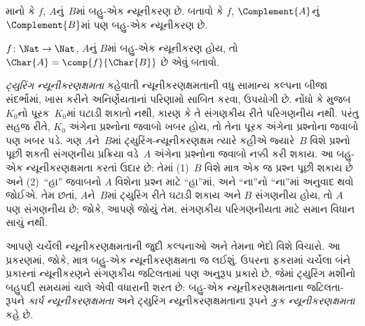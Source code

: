 \documentclass[../../../include/open-logic-section]{subfiles}
\begin{document}
\begin{prob}
માનો કે $f$, $A$નું~$B$માં બહુ-એક ન્યૂનીકરણ છે. બતાવો કે
$f$, $\Complement{A}$નું $\Complement{B}$માં પણ બહુ-એક
ન્યૂનીકરણ છે.
\end{prob}

\begin{prob}
$f\colon \Nat \to \Nat$, $A$નું $B$માં બહુ-એક ન્યૂનીકરણ હોય, તો
$\Char{A} = \comp{f}{\Char{B}}$ છે એવું બતાવો.
\end{prob}

\begin{digress}
\emph{ટ્યુરિંગ ન્યૂનીકરણક્ષમતા} કહેવાતી ન્યૂનીકરણક્ષમતાની
વધુ સામાન્ય કલ્પના બીજા સંદર્ભોમાં, ખાસ કરીને
અનિર્ણેયતાનાં પરિણામો સાબિત કરવા, ઉપયોગી છે. નોંધો કે
 મુજબ $K_0$નો પૂરક~$K_0$માં
ઘટાડી શકાતો નથી, કારણ કે તે સંગણકીય રીતે પરિગણનીય નથી.
પરંતુ સહજ રીતે, $K_0$ અંગેના પ્રશ્નોના જવાબો ખબર હોય, તો
તેના પૂરક અંગેના પ્રશ્નોના જવાબો પણ ખબર પડે. ગણ $A$ને~$B$માં
ટ્યુરિંગ-ન્યૂનીકરણક્ષમ ત્યારે કહીએ જ્યારે~$B$ વિશે પ્રશ્નો
પૂછી શકતી સંગણનીય પ્રક્રિયા વડે~$A$ અંગેના પ્રશ્નોના જવાબો
નક્કી કરી શકાય. આ બહુ-એક ન્યૂનીકરણક્ષમતા કરતાં ઉદાર છે:
તેમાં (1)~$B$ વિશે માત્ર એક જ પ્રશ્ન પૂછી શકાય છે અને
(2)~``હા'' જવાબનો $A$ વિશેના પ્રશ્ન માટે ``હા''માં,
અને ``ના''નો ``ના''માં અનુવાદ થવો જોઈએ. તેમ છતાં,
$A$ને~$B$માં ટ્યુરિંગ રીતે ઘટાડી શકાય અને $B$ સંગણનીય
હોય, તો $A$ પણ સંગણનીય છે; જોકે, આપણે જોયું તેમ,
સંગણકીય પરિગણનીયતા માટે સમાન વિધાન સાચું નથી.

આપણે ચર્ચેલી ન્યૂનીકરણક્ષમતાની જુદી કલ્પનાઓ અને તેમના
ભેદો વિશે વિચારો. આ પ્રકરણમાં, જોકે, માત્ર બહુ-એક
ન્યૂનીકરણક્ષમતા જ લઈશું. ઉપરના ફકરામાં ચર્ચેલા બંને પ્રકારનાં
ન્યૂનીકરણને સંગણકીય જટિલતામાં પણ અનુરૂપ પ્રકારો છે, જેમાં
ટ્યુરિંગ મશીનો બહુપદી સમયમાં ચાલે એવી વધારાની શરત છે:
બહુ-એક ન્યૂનીકરણક્ષમતાના જટિલતા-રૂપને \emph{કાર્પ
ન્યૂનીકરણક્ષમતા} અને ટ્યુરિંગ ન્યૂનીકરણક્ષમતાના રૂપને
\emph{કુક ન્યૂનીકરણક્ષમતા} કહે છે.
\end{digress}
\end{document}
